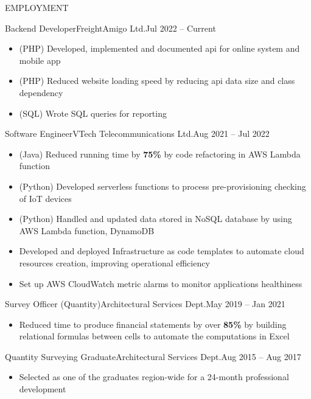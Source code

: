 \documentclass[]{resume}
\begin{document}
	\makeheader
	
	\begin{cvsection}{EMPLOYMENT}
		\begin{cvsubsection}{Backend Developer}{FreightAmigo Ltd.}{Jul 2022 -- Current}
			\begin{itemize}
				\item (PHP) Developed, implemented and documented api for online system and mobile app
				\item (PHP) Reduced website loading speed by reducing api data size and class dependency
				\item (SQL) Wrote SQL queries for reporting
			\end{itemize}
		\end{cvsubsection}
		
		\begin{cvsubsection}{Software Engineer}{VTech Telecommunications Ltd.}{Aug 2021 -- Jul 2022}
			\begin{itemize}
				\item (Java) Reduced running time by \textbf{75\%} by code refactoring in AWS Lambda function
				\item (Python) Developed serverless functions to process pre-provisioning checking of IoT devices
				\item (Python) Handled and updated data stored in NoSQL database by using AWS Lambda function, DynamoDB
				\item Developed and deployed Infrastructure as code templates to automate cloud resources creation, improving operational efficiency
				\item Set up AWS CloudWatch metric alarms to monitor applications healthiness
			\end{itemize}
		\end{cvsubsection}
		
		\begin{cvsubsection}{Survey Officer (Quantity)}{Architectural Services Dept.}{May 2019 -- Jan 2021}	
			\begin{itemize}
				\item Reduced time to produce financial statements by over \textbf{85\%} by building relational formulas between cells to automate the computations in Excel
			\end{itemize}
		\end{cvsubsection}
		
		\begin{cvsubsection}{Quantity Surveying Graduate}{Architectural Services Dept.}{Aug 2015 -- Aug 2017}		
			\begin{itemize}
				\item Selected as one of the graduates region-wide for a 24-month professional development
			\end{itemize}
		\end{cvsubsection}
	\end{cvsection}
\end{document}
